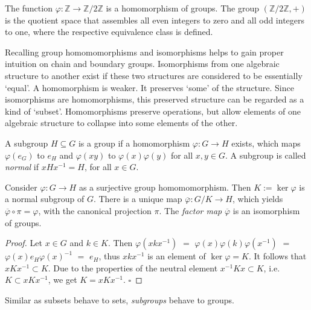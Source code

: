 \documentclass[envcountsect,runningheads]{llncs}
\renewcommand{\qed}{\hfill$\square$}
\begin{document}
\begin{example}
The function $\varphi: \mathbb{Z} \rightarrow \mathbb{Z}/2\mathbb{Z}$ is a homomorphism of groups. The group $(\mathbb{Z}/2\mathbb{Z},+)$ is the quotient space that assembles all even integers to zero and all odd integers to one, where the respective equivalence class is defined.
\end{example}

\begin{remark}
Recalling group homomomorphisms and isomorphisms helps to gain proper intuition on chain and boundary groups. Isomorphisms from one algebraic structure to another exist if these two structures are considered to be essentially `equal'. A homomorphism is weaker. It preserves `some' of the structure. Since isomorphisms are homomorphisms, this preserved structure can be regarded as a kind of `subset'. Homomorphisms preserve operations, but allow elements of one algebraic structure to collapse into some elements of the other. 
\end{remark}

\begin{definition}
A subgroup $H \subseteq G$ is a group if a homomorphism $\varphi: G \rightarrow H$ exists, which maps $\varphi(e_G)$ to $e_H$ and $\varphi(xy)$ to $\varphi(x)\varphi(y)$ for all $x,y \in G$. A subgroup is called \emph{normal} if $xHx^{-1} = H$, for all $x \in G$.
\end{definition}

\begin{example}{\cite[p.~5]{van2003lie}}
Consider $\varphi:G\rightarrow H$ as a surjective group homomomorphism. Then $K := \ker \varphi$ is a normal subgroup of $G$. There is a unique map $\overline{\varphi}: G/K \rightarrow H$, which yields $\overline{\varphi} \circ \pi = \varphi$, with the canonical projection $\pi$. The \emph{factor map} $\overline{\varphi}$ is an isomorphism of groups.
\end{example}

\begin{proof}
Let $x \in G$ and $k \in K$. Then $\varphi(xkx^{-1})$ $=$ $\varphi(x)\varphi(k)\varphi(x^{-1})$ $=$ $\varphi(x)e_H\varphi(x)^{-1}$ $=$ $e_H$, thus $xkx^{-1}$ is an element of $\ker \varphi = K$. It follows that $xKx^{-1} \subset K$. Due to the properties of the neutral element $x^{-1}Kx \subset K$, i.e. $K \subset xKx^{-1}$, we get $K = xKx^{-1}$. \qed
\end{proof}

\begin{remark}
Similar as subsets behave to sets, \emph{subgroups} behave to groups. 
\end{remark}
\end{document}
